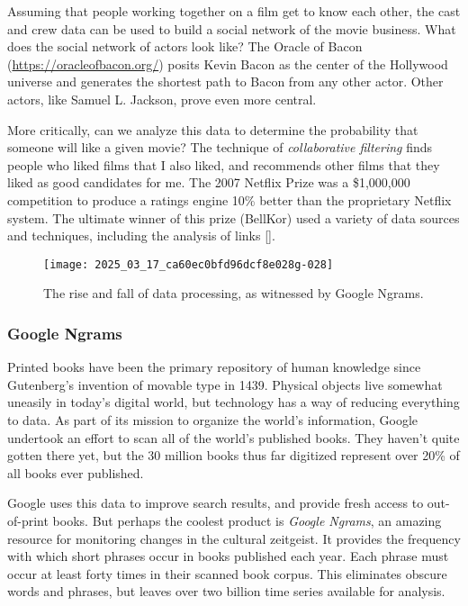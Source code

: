 \documentclass[10pt]{article}
\begin{document}
Assuming that people working together on a film get to know each other, the cast and crew data can be used to build a social network of the movie business. What does the social network of actors look like? The Oracle of Bacon (\href{https://oracleofbacon.org/}{https://oracleofbacon.org/}) posits Kevin Bacon as the center of the Hollywood universe and generates the shortest path to Bacon from any other actor. Other actors, like Samuel L. Jackson, prove even more central.

More critically, can we analyze this data to determine the probability that someone will like a given movie? The technique of \textit{collaborative filtering} finds people who liked films that I also liked, and recommends other films that they liked as good candidates for me. The 2007 Netflix Prize was a \$1,000,000 competition to produce a ratings engine 10\% better than the proprietary Netflix system. The ultimate winner of this prize (BellKor) used a variety of data sources and techniques, including the analysis of links [\cite{bell2007lessons}].

\begin{figure}[h]
    \centering
    \texttt{[image: 2025\_03\_17\_ca60ec0bfd96dcf8e028g-028]}
    \caption{The rise and fall of data processing, as witnessed by Google Ngrams.}
\end{figure}

\subsubsection*{Google Ngrams}
Printed books have been the primary repository of human knowledge since Gutenberg's invention of movable type in 1439. Physical objects live somewhat uneasily in today's digital world, but technology has a way of reducing everything to data. As part of its mission to organize the world's information, Google undertook an effort to scan all of the world's published books. They haven't quite gotten there yet, but the 30 million books thus far digitized represent over 20\% of all books ever published.

Google uses this data to improve search results, and provide fresh access to out-of-print books. But perhaps the coolest product is \textit{Google Ngrams}, an amazing resource for monitoring changes in the cultural zeitgeist. It provides the frequency with which short phrases occur in books published each year. Each phrase must occur at least forty times in their scanned book corpus. This eliminates obscure words and phrases, but leaves over two billion time series available for analysis.
\end{document}
